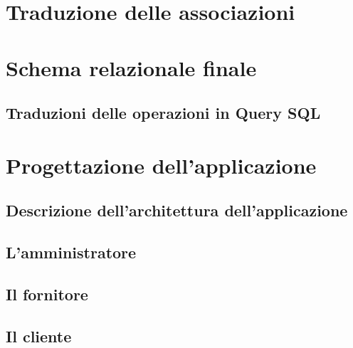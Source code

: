 \documentclass{article}
\begin{document}
\section{Traduzione delle associazioni}



\section{Schema relazionale finale} %


\subsection{Traduzioni delle operazioni in Query SQL}




\section{Progettazione dell'applicazione}
\subsection{Descrizione dell'architettura dell'applicazione}
 

\subsection{L'amministratore}


\subsection{Il fornitore}


\subsection{Il cliente}

\end{document}
